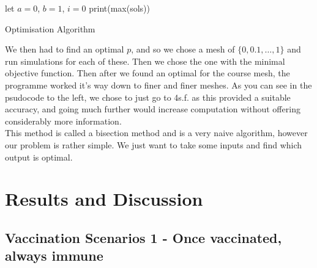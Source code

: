 \documentclass{article}
\begin{document}
\begin{minipage}{0.45\textwidth}
\begin{algorithm}[H]
\SetAlgoLined
{}
 let $a = 0$, $b = 1$, $i = 0$\;
 print(max(sols))
 \caption{Optimisation Algorithm}
\end{algorithm}
\end{minipage}
\hspace{\fill}
\begin{minipage}{0.45\textwidth}
  We then had to find an optimal $p$, and so we chose a mesh of $\{0, 0.1, \dots, 1\}$ and run simulations for each of these. Then we chose the one with the minimal objective function. Then after we found an optimal for the course mesh, the programme worked it's way down to finer and finer meshes. As you can see in the psudocode to the left, we chose to just go to 4s.f. as this provided a suitable accuracy, and going much further would increase computation without offering considerably more information. \\
  
  This method is called a bisection method and is a very naive algorithm, however our problem is rather simple. We just want to take some inputs and find which output is optimal. 
\end{minipage}

\newpage
\section{Results and Discussion}
\subsection{Vaccination Scenarios 1 - Once vaccinated, always immune}
\end{document}

